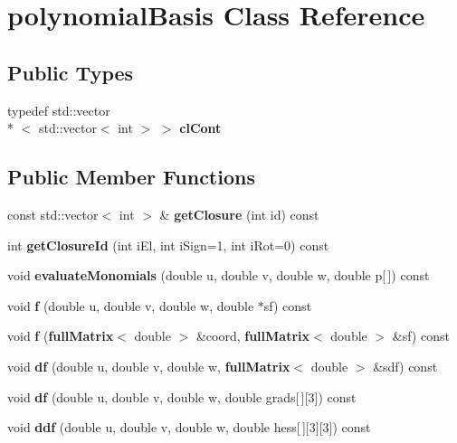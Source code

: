 \section{polynomial\-Basis Class Reference}
\label{classpolynomialBasis}
\subsection*{Public Types}
\begin{DoxyCompactItemize}
\item 
typedef std\-::vector\\*
$<$ std\-::vector$<$ int $>$ $>$ {\bfseries cl\-Cont}\label{classpolynomialBasis_ab85d4fe1832aaca7f8c8c1be95fae29d}

\end{DoxyCompactItemize}
\subsection*{Public Member Functions}
\begin{DoxyCompactItemize}
\item 
const std\-::vector$<$ int $>$ \& {\bfseries get\-Closure} (int id) const \label{classpolynomialBasis_a9a3f26911573cf646d512087233fa679}

\item 
int {\bfseries get\-Closure\-Id} (int i\-El, int i\-Sign=1, int i\-Rot=0) const \label{classpolynomialBasis_a82f52a56bb1d492dd9b91e125f6eafad}

\item 
void {\bfseries evaluate\-Monomials} (double u, double v, double w, double p[$\,$]) const \label{classpolynomialBasis_ac51373c1cc118935f95e952aba403ec2}

\item 
void {\bfseries f} (double u, double v, double w, double $\ast$sf) const \label{classpolynomialBasis_aecdc7848810e8e1c5e9b9b656e0d461b}

\item 
void {\bfseries f} ({\bf full\-Matrix}$<$ double $>$ \&coord, {\bf full\-Matrix}$<$ double $>$ \&sf) const \label{classpolynomialBasis_ad21f18524a09e2282bda2d73b2cbc44e}

\item 
void {\bfseries df} (double u, double v, double w, {\bf full\-Matrix}$<$ double $>$ \&sdf) const \label{classpolynomialBasis_ab36b4e631f7f6abe02733cc831882824}

\item 
void {\bfseries df} (double u, double v, double w, double grads[$\,$][3]) const \label{classpolynomialBasis_a34779f99820fbe1d53d7f20312034fda}

\item 
void {\bfseries ddf} (double u, double v, double w, double hess[$\,$][3][3]) const \label{classpolynomialBasis_a73b6829c01525d44d024d9d757a63717}

\end{DoxyCompactItemize}
